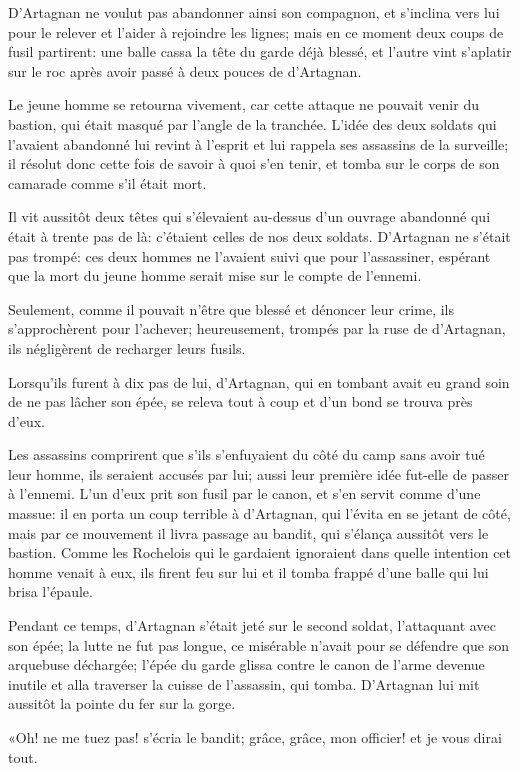 D'Artagnan ne voulut pas abandonner ainsi son compagnon, et s'inclina vers lui pour le relever et l'aider à rejoindre les lignes; mais en ce moment deux coups de fusil partirent: une balle cassa la tête du garde déjà blessé, et l'autre vint s'aplatir sur le roc après avoir passé à deux pouces de d'Artagnan. 

Le jeune homme se retourna vivement, car cette attaque ne pouvait venir du bastion, qui était masqué par l'angle de la tranchée. L'idée des deux soldats qui l'avaient abandonné lui revint à l'esprit et lui rappela ses assassins de la surveille; il résolut donc cette fois de savoir à quoi s'en tenir, et tomba sur le corps de son camarade comme s'il était mort. 

Il vit aussitôt deux têtes qui s'élevaient au-dessus d'un ouvrage abandonné qui était à trente pas de là: c'étaient celles de nos deux soldats. D'Artagnan ne s'était pas trompé: ces deux hommes ne l'avaient suivi que pour l'assassiner, espérant que la mort du jeune homme serait mise sur le compte de l'ennemi. 

Seulement, comme il pouvait n'être que blessé et dénoncer leur crime, ils s'approchèrent pour l'achever; heureusement, trompés par la ruse de d'Artagnan, ils négligèrent de recharger leurs fusils. 

Lorsqu'ils furent à dix pas de lui, d'Artagnan, qui en tombant avait eu grand soin de ne pas lâcher son épée, se releva tout à coup et d'un bond se trouva près d'eux. 

Les assassins comprirent que s'ils s'enfuyaient du côté du camp sans avoir tué leur homme, ils seraient accusés par lui; aussi leur première idée fut-elle de passer à l'ennemi. L'un d'eux prit son fusil par le canon, et s'en servit comme d'une massue: il en porta un coup terrible à d'Artagnan, qui l'évita en se jetant de côté, mais par ce mouvement il livra passage au bandit, qui s'élança aussitôt vers le bastion. Comme les Rochelois qui le gardaient ignoraient dans quelle intention cet homme venait à eux, ils firent feu sur lui et il tomba frappé d'une balle qui lui brisa l'épaule. 

Pendant ce temps, d'Artagnan s'était jeté sur le second soldat, l'attaquant avec son épée; la lutte ne fut pas longue, ce misérable n'avait pour se défendre que son arquebuse déchargée; l'épée du garde glissa contre le canon de l'arme devenue inutile et alla traverser la cuisse de l'assassin, qui tomba. D'Artagnan lui mit aussitôt la pointe du fer sur la gorge. 

«Oh! ne me tuez pas! s'écria le bandit; grâce, grâce, mon officier! et je vous dirai tout. 

